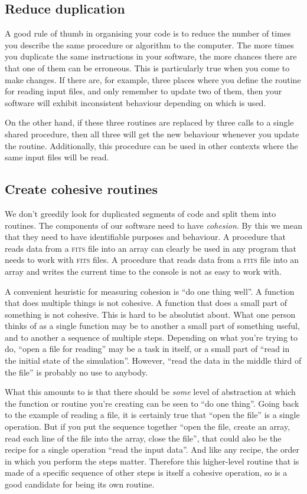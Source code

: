 \documentclass[a4paper]{article}
\begin{document}
\subsection{Reduce duplication}

A good rule of thumb in organising your code is to reduce the number of times you describe the same procedure or algorithm to the computer. The more times you duplicate the same instructions in your software, the more chances there are that one of them can be erroneous. This is particularly true when you come to make changes. If there are, for example, three places where you define the routine for reading input files, and only remember to update two of them, then your software will exhibit inconsistent behaviour depending on which is used.

On the other hand, if these three routines are replaced by three calls to a single shared procedure, then all three will get the new behaviour whenever you update the routine. Additionally, this procedure can be used in other contexts where the same input files will be read.

\subsection {Create cohesive routines}

We don't greedily look for duplicated segments of code and split them into routines. The components of our software need to have \textit{cohesion}. By this we mean that they need to have identifiable purposes and behaviour. A procedure that reads data from a \textsc{fits} file into an array can clearly be used in any program that needs to work with \textsc{fits} files. A procedure that reads data from a \textsc{fits} file into an array and writes the current time to the console is not as easy to work with.

A convenient heuristic for measuring cohesion is ``do one thing well''. A function that does multiple things is not cohesive. A function that does a small part of something is not cohesive. This is hard to be absolutist about. What one person thinks of as a single function may be to another a small part of something useful, and to another a sequence of multiple steps. Depending on what you're trying to do, ``open a file for reading'' may be a task in itself, or a small part of ``read in the initial state of the simulation''. However, ``read the data in the middle third of the file'' is probably no use to anybody.

What this amounts to is that there should be \textit{some} level of abstraction at which the function or routine you're creating can be seen to ``do one thing''. Going back to the example of reading a file, it is certainly true that ``open the file'' is a single operation. But if you put the sequence together ``open the file, create an array, read each line of the file into the array, close the file'', that could also be the recipe for a single operation ``read the input data''. And like any recipe, the order in which you perform the steps matter. Therefore this higher-level routine that is made of a specific sequence of other steps is itself a cohesive operation, so is a good candidate for being its own routine.
\end{document}
